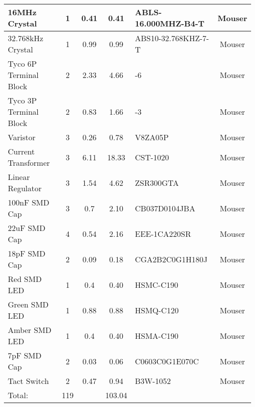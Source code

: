 {\begin{longtable}[c]{|>{\centering}b{1in}|c|c|c|>{\centering}b{1in}|c|}
\hline
16MHz Crystal                   & 1   & 0.41  & 0.41   & ABLS-16.000MHZ-B4-T & Mouser         \\
\hline
32.768kHz Crystal               & 1   & 0.99  & 0.99   & ABS10-32.768KHZ-7-T & Mouser         \\
\hline
Tyco 6P Terminal Block          & 2   & 2.33  & 4.66   & 796949-6            & Mouser         \\
\hline
Tyco 3P Terminal Block          & 2   & 0.83  & 1.66   & 796949-3            & Mouser         \\
\hline
Varistor                        & 3   & 0.26  & 0.78   & V8ZA05P             & Mouser         \\
\hline
Current Transformer             & 3   & 6.11  & 18.33  & CST-1020            & Mouser         \\
\hline
Linear Regulator                & 3   & 1.54  & 4.62   & ZSR300GTA           & Mouser         \\
\hline
100nF SMD Cap                   & 3   & 0.7   & 2.10   & CB037D0104JBA       & Mouser         \\
\hline
22uF SMD Cap                    & 4   & 0.54  & 2.16   & EEE-1CA220SR        & Mouser         \\
\hline
18pF SMD Cap                    & 2   & 0.09  & 0.18   & CGA2B2C0G1H180J     & Mouser         \\
\hline
Red SMD LED                     & 1   & 0.4   & 0.40   & HSMC-C190           & Mouser         \\
\hline
Green SMD LED                   & 1   & 0.88  & 0.88   & HSMQ-C120           & Mouser         \\
\hline
Amber SMD LED                   & 1   & 0.4   & 0.40   & HSMA-C190           & Mouser         \\
\hline
7pF SMD Cap                     & 2   & 0.03  & 0.06   & C0603C0G1E070C      & Mouser         \\
\hline
Tact Switch                     & 2   & 0.47  & 0.94   & B3W-1052            & Mouser         \\
\hline
Total:                          & 119 &       & 103.04 &                     &                \\
\hline
\hline
\end{longtable}
}
